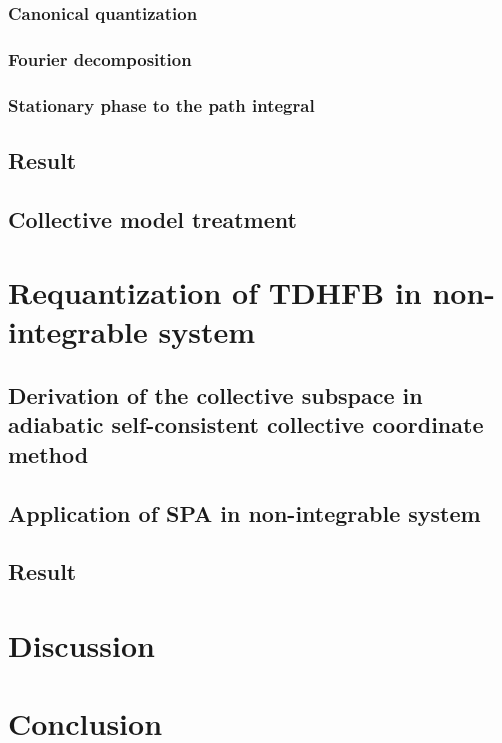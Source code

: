 \documentclass[11pt]{book} %
\begin{document}
\subsection{Canonical quantization}

\subsection{Fourier decomposition}

\subsection{Stationary phase to the path integral}

\section{Result}

\section{Collective model treatment} 

\chapter{Requantization of TDHFB in non-integrable system}
\label{non-integrable}


\section{Derivation of the collective subspace in adiabatic self-consistent collective coordinate method}

\section{Application of SPA in non-integrable system}

\section{Result}

\chapter{Discussion}

\chapter{Conclusion}
\end{document}

